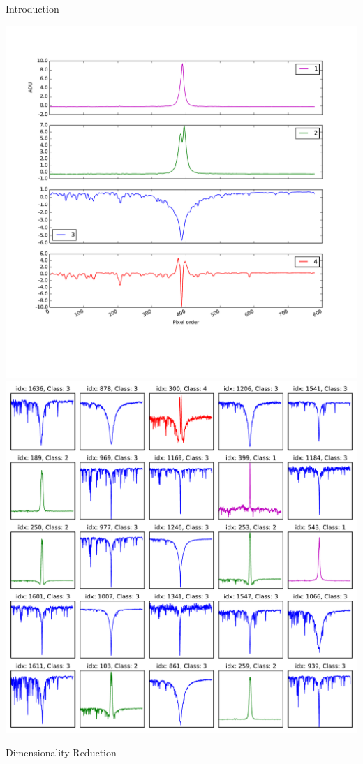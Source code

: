 \documentclass[final,hyperref={pdfpagelabels=false}]{beamer}
\begin{document}
\begin{frame}[t]
\begin{columns}[t]
\begin{column}{.465\textwidth}
\begin{block}{Introduction}
\begin{itemize}
\end{itemize}

\includegraphics[width=0.45\linewidth]{categories} 
\includegraphics[width=0.45\linewidth]{sample} 

\end{block}


\begin{block}{Dimensionality Reduction}


\end{block}
\end{column}
\end{columns}
\end{frame}
\end{document}
